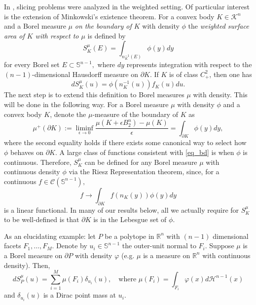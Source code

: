 \documentclass[11pt]{amsart}
\theoremstyle{definition}
\theoremstyle{remark}
\numberwithin{equation}{section}
\newcommand{\R}{\mathbb{R}}
\newcommand{\s}{\mathbb{S}}
\newcommand{\conbod}{\mathcal{K}^n}
\begin{document}
In \cite{HJ21, KK18,KL20, AK12,AK14,AK15,KPZv,Ro20, Zv08}, slicing problems were analyzed in the weighted setting. Of particular interest is the extension of Minkowski's existence theorem. For a convex body $K\in\conbod$ and a Borel measure $\mu$ \textit{on the boundary of $K$} with density $\phi$ the \textit{weighted surface area of $K$ with respect to $\mu$} is defined by
\begin{equation}
    \label{eq:surface_mu}
    S^{\mu}_{K}(E)=\int_{n_K^{-1}(E)}\phi(y)dy
\end{equation}
for every Borel set $E \subset \s^{n-1},$ where $dy$ represents integration with respect to the $(n-1)$-dimensional Hausdorff measure on $\partial K.$ If $K$ is of class $C^2_+$, then one has $$dS^{\mu}_{K}(u)=\phi\left(n_K^{-1}(u)\right)f_K(u)du.$$ 
The next step is to extend this definition to Borel measures $\mu$ with density. This will be done in the following way. For a Borel measure $\mu$ with density $\phi$ and a convex body $K$, denote the $\mu$-measure of the boundary of $K$ as 
\begin{equation}\mu^+(\partial K):=\liminf_{\epsilon\to 0}\frac{\mu\left(K+\epsilon B_2^n\right)-\mu(K)}{\epsilon}=\int_{\partial K}\phi(y)dy,
\label{eq_bd}
\end{equation}
where the second equality holds if there exists some canonical way to select how $\phi$ behaves on $\partial K$. A large class of functions consistent with \eqref{eq_bd} is when $\phi$ is continuous. Therefore, $S^{\mu}_{K}$ can be defined for any Borel measure $\mu$ with continuous density $\phi$ via the Riesz Representation theorem, since, for a continuous $f\in \mathcal{C}(\s^{n-1}),$
$$f\to \int_{\partial K}f(n_K(y))\phi(y)dy$$ is a linear functional. In many of our results below, all we actually require for $S^\mu_K$ to be well-defined is that $\partial K$ is in the Lebesgue set of $\phi$.

As an elucidating example: let $P$ be a polytope in $\R^n$ with $(n-1)$ dimensional facets $F_1,\dots,F_M$. Denote by $u_i\in\s^{n-1}$ the outer-unit normal to $F_i$. Suppose $\mu$ is a Borel measure on $\partial P$ with density $\varphi$ (e.g. $\mu$ is a measure on $\R^n$ with continuous density). Then,
$$dS^\mu_{P}(u)=\sum_{i=1}^M\mu(F_i)\delta_{u_i}(u), \quad \text{where }\mu(F_i)=\int_{F_i}\varphi(x)d\mathcal{H}^{n-1}(x)$$
and $\delta_{u_i}(u)$ is a Dirac point mass at $u_i$.
\end{document}

